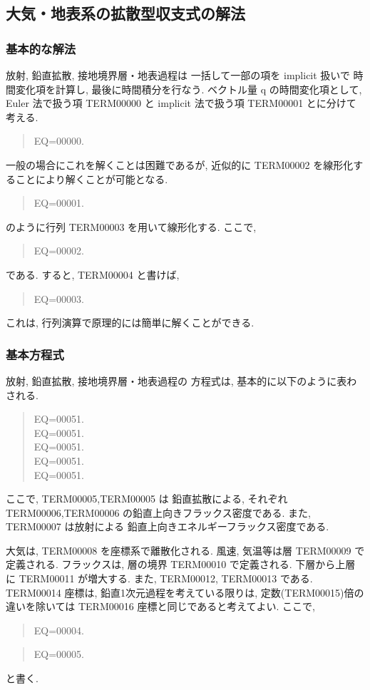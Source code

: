 ﻿
\subsection{大気・地表系の拡散型収支式の解法}

\subsubsection{基本的な解法}

放射, 鉛直拡散, 接地境界層・地表過程は
一括して一部の項を implicit 扱いで
時間変化項を計算し, 最後に時間積分を行なう.
ベクトル量 {\boldmath q} の時間変化項として,
Euler 法で扱う項 TERM00000 と implicit 法で扱う項 TERM00001 とに分けて考える.
%
\begin{quote}
EQ=00000.
\end{quote}
%
一般の場合にこれを解くことは困難であるが,
近似的に TERM00002 を線形化することにより解くことが可能となる.
\begin{quote}
EQ=00001.
\end{quote}
のように行列 TERM00003 を用いて線形化する.
ここで,
\begin{quote}
EQ=00002.
\end{quote}
である. 
すると, 
TERM00004
と書けば,
\begin{quote}
EQ=00003.
\end{quote}
%
これは, 行列演算で原理的には簡単に解くことができる.

\subsubsection{基本方程式}

放射, 鉛直拡散, 接地境界層・地表過程の
方程式は, 基本的に以下のように表わされる.
%
\begin{quote}
EQ=00051.\\
EQ=00051.\\
EQ=00051.\\
EQ=00051.\\
EQ=00051.
\end{quote}
%
ここで, TERM00005,TERM00005 は
鉛直拡散による, それぞれ TERM00006,TERM00006
の鉛直上向きフラックス密度である.
また, TERM00007 は放射による
鉛直上向きエネルギーフラックス密度である.

大気は, TERM00008 を座標系で離散化される.
風速, 気温等は層 TERM00009 で定義される.
フラックスは, 層の境界 TERM00010 で定義される.
下層から上層に TERM00011 が増大する.
また, TERM00012, 
TERM00013 である.
TERM00014 座標は, 鉛直1次元過程を考えている限りは, 
定数(TERM00015)倍の違いを除いては TERM00016 座標と同じであると考えてよい.
ここで,
\begin{quote}
EQ=00004.
\end{quote}
\begin{quote}
EQ=00005.
\end{quote}
と書く.

